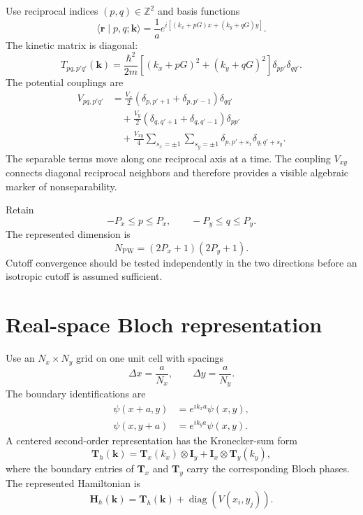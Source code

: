 Use reciprocal indices $(p,q)\in\mathbb Z^2$ and basis functions
\begin{equation}
    \langle\mathbf r\mid p,q;\mathbf k\rangle
    =
    \frac{1}{a}
    e^{i[(k_x+pG)x+(k_y+qG)y]}.
\end{equation}
The kinetic matrix is diagonal:
\begin{equation}
    T_{pq,p'q'}(\mathbf k)
    =
    \frac{\hbar^2}{2m}
    \left[
        (k_x+pG)^2+(k_y+qG)^2
    \right]
    \delta_{pp'}\delta_{qq'}.
\end{equation}
The potential couplings are
\begin{align}
    V_{pq,p'q'}
    &=
    \frac{V_x}{2}
    \left(
        \delta_{p,p'+1}+\delta_{p,p'-1}
    \right)
    \delta_{qq'}
    \\
    &\quad+
    \frac{V_y}{2}
    \left(
        \delta_{q,q'+1}+\delta_{q,q'-1}
    \right)
    \delta_{pp'}
    \\
    &\quad+
    \frac{V_{xy}}{4}
    \sum_{s_x=\pm1}
    \sum_{s_y=\pm1}
    \delta_{p,p'+s_x}
    \delta_{q,q'+s_y}.
\end{align}
The separable terms move along one reciprocal axis at a time. The coupling
$V_{xy}$ connects diagonal reciprocal neighbors and therefore provides a
visible algebraic marker of nonseparability.

Retain
\begin{equation}
    -P_x\leq p\leq P_x,
    \qquad
    -P_y\leq q\leq P_y.
\end{equation}
The represented dimension is
\begin{equation}
    N_{\mathrm{PW}}
    =
    (2P_x+1)(2P_y+1).
\end{equation}
Cutoff convergence should be tested independently in the two directions before
an isotropic cutoff is assumed sufficient.

\section{Real-space Bloch representation}

Use an $N_x\times N_y$ grid on one unit cell with spacings
\begin{equation}
    \Delta x=\frac{a}{N_x},
    \qquad
    \Delta y=\frac{a}{N_y}.
\end{equation}
The boundary identifications are
\begin{align}
    \psi(x+a,y)&=e^{ik_xa}\psi(x,y),
    \\
    \psi(x,y+a)&=e^{ik_ya}\psi(x,y).
\end{align}
A centered second-order representation has the Kronecker-sum form
\begin{equation}
    \mathbf T_h(\mathbf k)
    =
    \mathbf T_x(k_x)\otimes\mathbf I_y
    +
    \mathbf I_x\otimes\mathbf T_y(k_y),
\end{equation}
where the boundary entries of $\mathbf T_x$ and $\mathbf T_y$ carry the
corresponding Bloch phases. The represented Hamiltonian is
\begin{equation}
    \mathbf H_h(\mathbf k)
    =
    \mathbf T_h(\mathbf k)
    +
    \operatorname{diag}
    \left(
        V(x_i,y_j)
    \right).
\end{equation}

